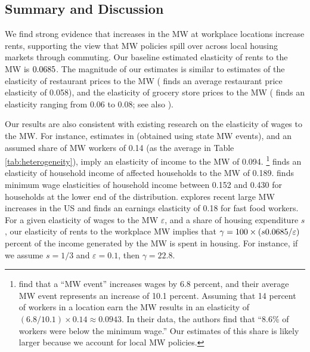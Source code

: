 \subsection{Summary and Discussion}
\label{sec:results_discussion}

We find strong evidence that increases in the MW at workplace locations 
increase rents, supporting the view that MW policies spill over across local
housing markets through commuting.
Our baseline estimated elasticity of rents to the MW is $0.0685$.
The magnitude of our estimates is similar to estimates of the elasticity of 
restaurant prices to the MW 
(\cite{AllegrettoReich2018} finds an average restaurant price elasticity of 0.058),
and the elasticity of grocery store prices to the MW 
(\cite{Leung2021} finds an elasticity ranging from 0.06 to 0.08; see also 
\cite{RenkinEtAl2020}).

Our results are also consistent with existing research on the elasticity 
of wages to the MW.
For instance, estimates in \textcite{CegnizEtAl2019} (obtained using state MW 
events), and an assumed share of MW workers of 0.14 (as the average in Table 
\ref{tab:heterogeneity}), imply an elasticity of income to the MW of 0.094.%
\footnote{\textcite[][Table I]{CegnizEtAl2019} find that a ``MW event'' 
    increases wages by 6.8 percent, and their average MW event 
    represents an increase of 10.1 percent.
    Assuming that 14 percent of workers in a location earn the MW results 
    in an elasticity of $(6.8/10.1)\times 0.14 \approx 0.0943$.
    In their data, the authors find that ``8.6\% of workers were below the 
    minimum wage.''
    Our estimates of this share is likely larger because we account for local 
    MW policies.}
\textcite[][Table 1]{Hughes2020} finds an elasticity of household income of 
affected households to the MW of 0.189.
\textcite{Dube2019Income} finds minimum wage elasticities of household income 
between 0.152 and 0.430 for households at the lower end of the distribution.
\textcite{WiltshireEtAl2023} explores recent large MW increases in the US and 
finds an earnings elasticity of 0.18 for fast food workers.
For a given elasticity of wages to the MW $\varepsilon$, and a share of housing 
expenditure $s$, our elasticity of rents to the workplace MW implies that
$\gamma = 100 \times \left(s 0.0685 /\varepsilon\right)$ percent 
of the income generated by the MW is spent in housing.
For instance, if we assume $s=1/3$ and $\varepsilon=0.1$, then $\gamma=22.8$.

